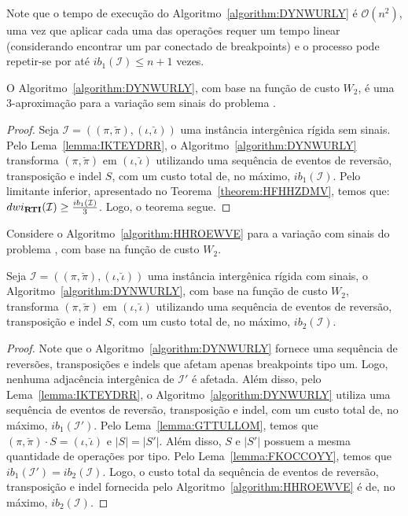 Note que o tempo de execução do Algoritmo~\ref{algorithm:DYNWURLY} é $\mathcal{O}(n^2)$, uma vez que aplicar cada uma das operações requer um tempo linear (considerando encontrar um par conectado de breakpoints) e o processo pode repetir-se por até $ib_1(\mathcal{I}) \le n + 1$ vezes.

\begin{theorem}\label{theorem:HXFXWAIA}
O Algoritmo~\ref{algorithm:DYNWURLY}, com base na função de custo $W_2$, é uma $3$-aproximação para a variação sem sinais do problema \SbWIRTI{}.
\end{theorem}
\begin{proof}
Seja $\mathcal{I}=((\pi,\breve\pi),(\iota,\breve\iota))$ uma instância intergênica rígida sem sinais. Pelo Lema~\ref{lemma:IKTEYDRR}, o Algoritmo~\ref{algorithm:DYNWURLY} transforma $(\pi,\breve\pi)$ em $(\iota,\breve\iota)$ utilizando uma sequência de eventos de reversão, transposição e indel $S$, com um custo total de, no máximo, $ib_1(\mathcal{I})$. Pelo limitante inferior, apresentado no Teorema~\ref{theorem:HFHHZDMV}, temos que: $dwi_{\textbf{RTI}}(\mathcal{I}) \ge \frac{ib_1(\mathcal{I})}{3}$. Logo, o teorema segue.
\end{proof}

Considere o Algoritmo~\ref{algorithm:HHROEWVE} para a variação com sinais do problema \SbWIRTI{}, com base na função de custo $W_2$.



\begin{lemma}\label{lemma:MBYKFLMR}
Seja $\mathcal{I} = ((\pi,\breve\pi),(\iota,\breve\iota))$ uma instância intergênica rígida com sinais, o Algoritmo~\ref{algorithm:DYNWURLY}, com base na função de custo $W_2$, transforma $(\pi,\breve\pi)$ em $(\iota,\breve\iota)$ utilizando uma sequência de eventos de reversão, transposição e indel $S$, com um custo total de, no máximo, $ib_2(\mathcal{I})$.
\end{lemma}
\begin{proof}
Note que o Algoritmo~\ref{algorithm:DYNWURLY} fornece uma sequência de reversões, transposições e indels que afetam apenas breakpoints tipo um. Logo, nenhuma adjacência intergênica de $\mathcal{I'}$ é afetada. Além disso, pelo Lema~\ref{lemma:IKTEYDRR}, o Algoritmo~\ref{algorithm:DYNWURLY} utiliza uma sequência de eventos de reversão, transposição e indel, com um custo total de, no máximo, $ib_1(\mathcal{I'})$. Pelo Lema~\ref{lemma:GTTULLOM}, temos que $(\pi,\breve\pi) \cdot S = (\iota,\breve\iota)$ e $|S| = |S'|$. Além disso, $S$ e $|S'|$ possuem a mesma quantidade de operações por tipo. Pelo Lema~\ref{lemma:FKOCCOYY}, temos que $ib_1(\mathcal{I'}) = ib_2(\mathcal{I})$. Logo, o custo total da sequência de eventos de reversão, transposição e indel fornecida pelo Algoritmo~\ref{algorithm:HHROEWVE} é de, no máximo, $ib_2(\mathcal{I})$.
\end{proof}

